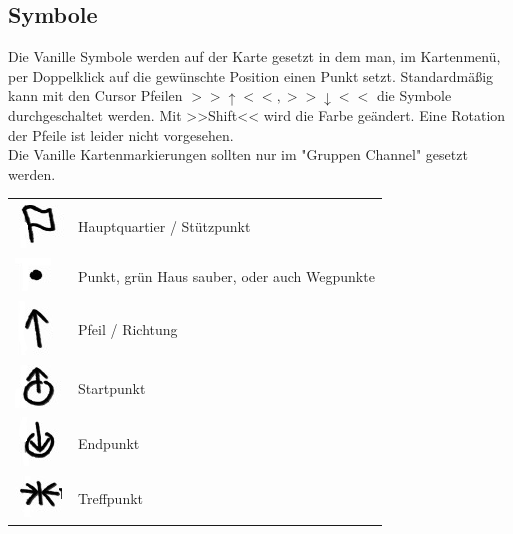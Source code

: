 \newpage

\subsection{Symbole}
	Die Vanille Symbole werden auf der Karte gesetzt in dem man, im Kartenmenü, per Doppelklick auf die gewünschte Position einen Punkt setzt. Standardmäßig kann mit den Cursor Pfeilen \begin{math} >>\uparrow<<, >>\downarrow<< \end{math} die Symbole durchgeschaltet werden. Mit >>Shift<< wird die Farbe geändert. Eine Rotation der Pfeile ist leider nicht vorgesehen. \\
	Die Vanille Kartenmarkierungen sollten nur im "Gruppen Channel" gesetzt werden.

\begin{longtable}{p{3cm} p{15cm}}
	\includegraphics[scale=1]{./Grafiken/KarteUndMarkierungen/HQ.png}			& 		Hauptquartier / Stützpunkt \\
	\includegraphics[scale=1]{./Grafiken/KarteUndMarkierungen/Punkt.png}			&		Punkt, grün Haus sauber, oder auch Wegpunkte \\
	\includegraphics[scale=1]{./Grafiken/KarteUndMarkierungen/Pfeil.png}			&		Pfeil / Richtung \\
	\includegraphics[scale=1]{./Grafiken/KarteUndMarkierungen/Start.png}			&		Startpunkt \\
	\includegraphics[scale=1]{./Grafiken/KarteUndMarkierungen/Endpunkt.png}		&		Endpunkt \\
	\includegraphics[scale=1]{./Grafiken/KarteUndMarkierungen/Treffpunkt.png} 		&		Treffpunkt \\

\end{longtable}
